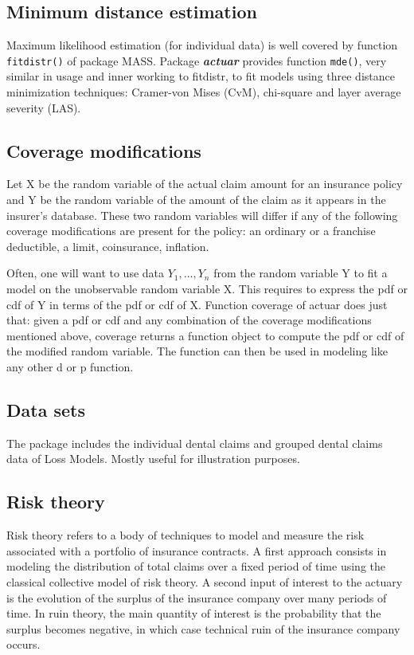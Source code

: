 \documentclass[12pt]{article}
\begin{document}
\subsection{Minimum distance estimation}

Maximum likelihood estimation (for individual data) is well covered by function \texttt{fitdistr()} of package MASS. Package \textbf{\textit{actuar}} provides function \texttt{mde()}, very similar in usage and inner working to fitdistr, to fit models using three distance minimization techniques: Cramer-von Mises (CvM), chi-square and layer average severity (LAS).

\subsection{Coverage modifications}

Let X be the random variable of the actual claim amount for an insurance policy and Y be the random variable of the amount of the claim as it appears in the insurer's database. These two random variables will differ if any of the following coverage modifications are present for the policy: an ordinary or a franchise deductible, a limit, coinsurance, inflation. 

Often, one will want to use data $Y_1, \ldots, Y_n$ from the random variable Y to fit a model on the unobservable random variable X. This requires to express the pdf or cdf of Y in terms of the pdf or cdf of X. Function coverage of actuar does just that: given a pdf or cdf and any combination of the coverage modifications mentioned above, coverage returns a function object to compute the pdf or cdf of the modified random variable. The function can then be used in modeling like any other d or p function.

\subsection{Data sets}

The package includes the individual dental claims and grouped dental claims data of Loss Models. Mostly useful for illustration purposes. 

\subsection{Risk theory}

Risk theory refers to a body of techniques to model and measure the risk associated with a portfolio of insurance contracts. A first approach consists in modeling the distribution of total claims over a fixed period of time using the classical collective model of risk theory. A second input of interest to the actuary is the evolution of the surplus of the insurance company over many periods of time. In ruin theory, the main quantity of interest is the probability that the surplus becomes negative, in which case technical ruin of the insurance company occurs.
\end{document}
